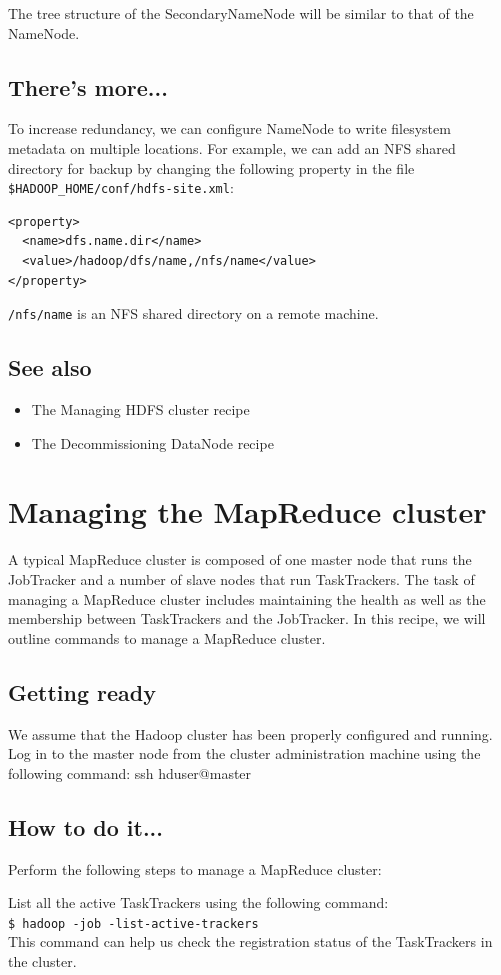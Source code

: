 The tree structure of the SecondaryNameNode will be similar to that of the NameNode.

\subsection*{There's more...}
To increase redundancy, we can configure NameNode to write filesystem metadata on multiple locations. For example, we can add an NFS shared directory for backup by changing the following property in the file \verb|$HADOOP_HOME/conf/hdfs-site.xml|:
\begin{verbatim}
<property>
  <name>dfs.name.dir</name>
  <value>/hadoop/dfs/name,/nfs/name</value>
</property>
\end{verbatim}

\verb|/nfs/name| is an NFS shared directory on a remote machine.
\subsection*{See also}
\begin{itemize}
\item The Managing HDFS cluster recipe
\item The Decommissioning DataNode recipe
\end{itemize}

\section{Managing the MapReduce cluster}
A typical MapReduce cluster is composed of one master node that runs the JobTracker and a number of slave nodes that run TaskTrackers. The task of managing a MapReduce cluster includes maintaining the health as well as the membership between TaskTrackers and the JobTracker. In this recipe, we will outline commands to manage a MapReduce cluster.
\subsection*{Getting ready}
We assume that the Hadoop cluster has been properly configured and running.
Log in to the master node from the cluster administration machine using the following command:
ssh hduser@master
\subsection*{How to do it...}
Perform the following steps to manage a MapReduce cluster:

List all the active TaskTrackers using the following command: \\
\verb|$ hadoop -job -list-active-trackers| \\
This command can help us check the registration status of the TaskTrackers in the cluster.

